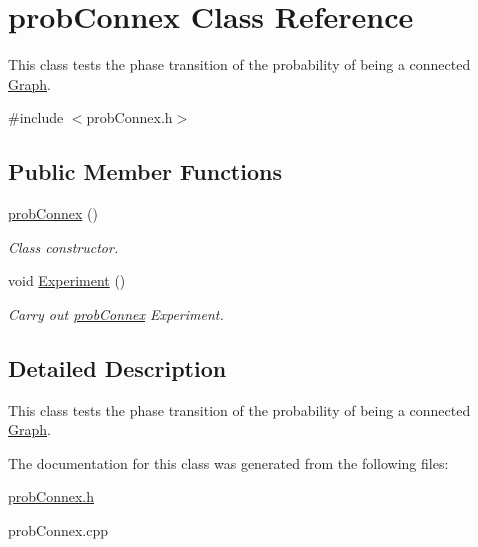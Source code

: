 \hypertarget{classprobConnex}{}\section{prob\+Connex Class Reference}
\label{classprobConnex}


This class tests the phase transition of the probability of being a connected \hyperlink{classGraph}{Graph}.  




{\ttfamily \#include $<$prob\+Connex.\+h$>$}

\subsection*{Public Member Functions}
\begin{DoxyCompactItemize}
\item 
\mbox{\label{classprobConnex_a872c6284a7a7c17379ee9f1f08c61bb5}} 
\hyperlink{classprobConnex_a872c6284a7a7c17379ee9f1f08c61bb5}{prob\+Connex} ()
\begin{DoxyCompactList}\small\item\em Class constructor. \end{DoxyCompactList}\item 
\mbox{\label{classprobConnex_aedb2ba36a7b65d63670a1a552c485991}} 
void \hyperlink{classprobConnex_aedb2ba36a7b65d63670a1a552c485991}{Experiment} ()
\begin{DoxyCompactList}\small\item\em Carry out \textquotesingle{}\hyperlink{classprobConnex}{prob\+Connex}\textquotesingle{} Experiment. \end{DoxyCompactList}\end{DoxyCompactItemize}


\subsection{Detailed Description}
This class tests the phase transition of the probability of being a connected \hyperlink{classGraph}{Graph}. 

The documentation for this class was generated from the following files\+:\begin{DoxyCompactItemize}
\item 
\hyperlink{probConnex_8h}{prob\+Connex.\+h}\item 
prob\+Connex.\+cpp\end{DoxyCompactItemize}
